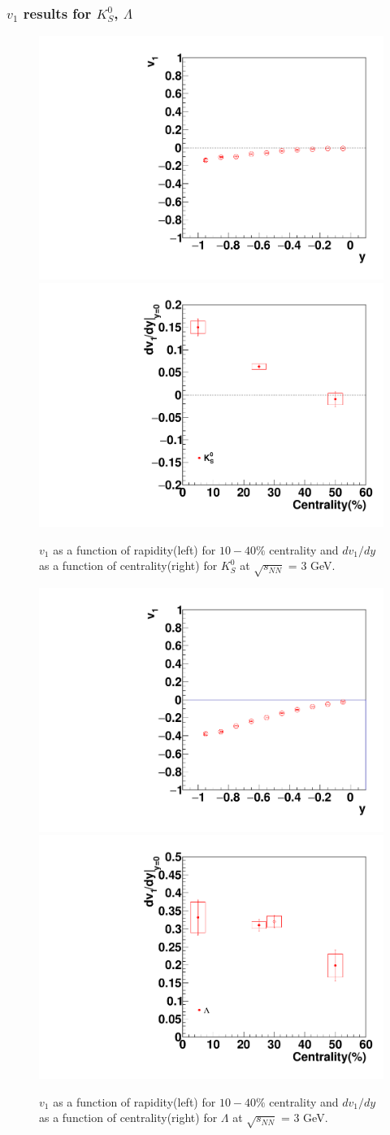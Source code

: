 \subsubsection{$v_1$ results for $K^0_S$, $\Lambda$}

\begin{figure}[h]
\includegraphics[width=0.49\linewidth]{chapterX/fig/ks_sys_v1.pdf}
\includegraphics[width=0.49\linewidth]{chapterX/fig/ks_sys_vn.pdf}
\caption{$v_1$ as a function of rapidity(left) for $10-40\%$ centrality and  $dv_{1}/dy$ as a function of centrality(right) for $K^{0}_{S}$ at $\sqrt{s_{NN}}$ = 3 GeV.}
\label{ks_dv1dy_sys}
\end{figure}

\begin{figure}[h]
\includegraphics[width=0.49\linewidth]{chapterX/fig/ld_sys_v1.pdf}
\includegraphics[width=0.49\linewidth]{chapterX/fig/ld_sys_vn.pdf}
\caption{$v_1$ as a function of rapidity(left) for $10-40\%$ centrality and  $dv_{1}/dy$ as a function of centrality(right) for $\Lambda$ at $\sqrt{s_{NN}}$ = 3 GeV.}
\label{lambda_dv1dy_sys}
\end{figure}


